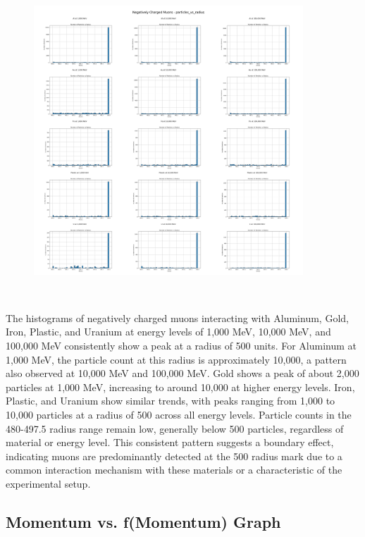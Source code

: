 \documentclass{article}
\begin{document}
\begin{figure}[H]
\centering
\includegraphics[width=0.9\textwidth]{images/Combined Plots/particles_vs_radius_mu-.png}
\end{figure}\

\noindent The histograms of negatively charged muons interacting with Aluminum, Gold, Iron, Plastic, and Uranium at energy levels of 1,000 MeV, 10,000 MeV, and 100,000 MeV consistently show a peak at a radius of 500 units. For Aluminum at 1,000 MeV, the particle count at this radius is approximately 10,000, a pattern also observed at 10,000 MeV and 100,000 MeV. Gold shows a peak of about 2,000 particles at 1,000 MeV, increasing to around 10,000 at higher energy levels. Iron, Plastic, and Uranium show similar trends, with peaks ranging from 1,000 to 10,000 particles at a radius of 500 across all energy levels. Particle counts in the 480-497.5 radius range remain low, generally below 500 particles, regardless of material or energy level. This consistent pattern suggests a boundary effect, indicating muons are predominantly detected at the 500 radius mark due to a common interaction mechanism with these materials or a characteristic of the experimental setup.

\subsection{Momentum vs. f(Momentum) Graph}
\end{document}
